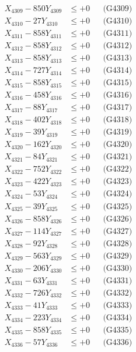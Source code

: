 \documentclass[a4paper,10pt]{article}
\begin{document}
{\begin{align}
X_{4309} - 850Y_{4309} &\leq +0 && \text{(G4309)} \\
X_{4310} - 27Y_{4310} &\leq +0 && \text{(G4310)} \\
\allowbreak
X_{4311} - 858Y_{4311} &\leq +0 && \text{(G4311)} \\
X_{4312} - 858Y_{4312} &\leq +0 && \text{(G4312)} \\
X_{4313} - 858Y_{4313} &\leq +0 && \text{(G4313)} \\
X_{4314} - 727Y_{4314} &\leq +0 && \text{(G4314)} \\
X_{4315} - 858Y_{4315} &\leq +0 && \text{(G4315)} \\
X_{4316} - 458Y_{4316} &\leq +0 && \text{(G4316)} \\
X_{4317} - 88Y_{4317} &\leq +0 && \text{(G4317)} \\
X_{4318} - 402Y_{4318} &\leq +0 && \text{(G4318)} \\
X_{4319} - 39Y_{4319} &\leq +0 && \text{(G4319)} \\
X_{4320} - 162Y_{4320} &\leq +0 && \text{(G4320)} \\
\allowbreak
X_{4321} - 84Y_{4321} &\leq +0 && \text{(G4321)} \\
X_{4322} - 752Y_{4322} &\leq +0 && \text{(G4322)} \\
X_{4323} - 422Y_{4323} &\leq +0 && \text{(G4323)} \\
X_{4324} - 53Y_{4324} &\leq +0 && \text{(G4324)} \\
X_{4325} - 39Y_{4325} &\leq +0 && \text{(G4325)} \\
X_{4326} - 858Y_{4326} &\leq +0 && \text{(G4326)} \\
X_{4327} - 114Y_{4327} &\leq +0 && \text{(G4327)} \\
X_{4328} - 92Y_{4328} &\leq +0 && \text{(G4328)} \\
X_{4329} - 563Y_{4329} &\leq +0 && \text{(G4329)} \\
X_{4330} - 206Y_{4330} &\leq +0 && \text{(G4330)} \\
\allowbreak
X_{4331} - 63Y_{4331} &\leq +0 && \text{(G4331)} \\
X_{4332} - 726Y_{4332} &\leq +0 && \text{(G4332)} \\
X_{4333} - 41Y_{4333} &\leq +0 && \text{(G4333)} \\
X_{4334} - 223Y_{4334} &\leq +0 && \text{(G4334)} \\
X_{4335} - 858Y_{4335} &\leq +0 && \text{(G4335)} \\
X_{4336} - 57Y_{4336} &\leq +0 && \text{(G4336)} \\

\end{align}}
\end{document}
